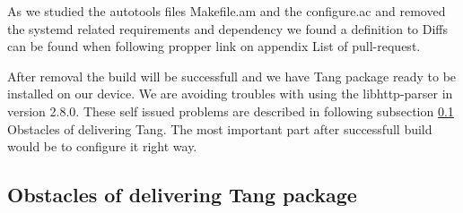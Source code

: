 As we studied the autotools files Makefile.am and the configure.ac and removed the systemd related requirements and dependency we found a definition to
Diffs can be found when following propper link on appendix \label{diffs} List of pull-request.

After removal the build will be successfull and we have Tang package ready to be installed on our device.
We are avoiding troubles with using the libhttp-parser in version 2.8.0.
These self issued problems are described in following subsection \ref{porting_problems} Obstacles of delivering Tang.
The most important part after successfull build would be to configure it right way.



\subsection{Obstacles of delivering Tang package}\label{porting_problems}



\paragraph{}
